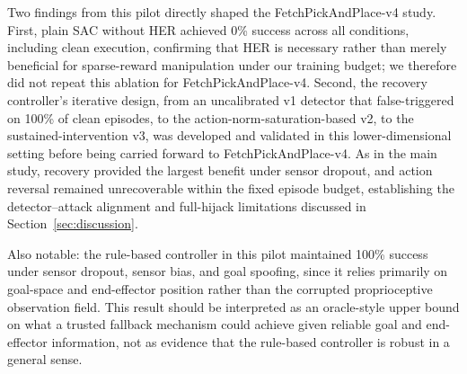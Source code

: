 \documentclass[conference]{IEEEtran}
\begin{document}
Two findings from this pilot directly shaped the FetchPickAndPlace-v4 study. First,
plain SAC without HER achieved 0\% success across all conditions, including clean
execution, confirming that HER is necessary rather than merely beneficial for
sparse-reward manipulation under our training budget; we therefore did not repeat this
ablation for FetchPickAndPlace-v4. Second, the recovery controller's iterative design,
from an uncalibrated v1 detector that false-triggered on 100\% of clean episodes, to
the action-norm-saturation-based v2, to the sustained-intervention v3, was developed
and validated in this lower-dimensional setting before being carried forward to
FetchPickAndPlace-v4. As in the main study, recovery provided the largest benefit under
sensor dropout, and action reversal remained unrecoverable within the fixed episode
budget, establishing the detector--attack alignment and full-hijack limitations
discussed in Section~\ref{sec:discussion}.

Also notable: the rule-based controller in this pilot maintained 100\% success under
sensor dropout, sensor bias, and goal spoofing, since it relies primarily on
goal-space and end-effector position rather than the corrupted proprioceptive
observation field. This result should be interpreted as an oracle-style upper bound on
what a trusted fallback mechanism could achieve given reliable goal and end-effector
information, not as evidence that the rule-based controller is robust in a general
sense.




\end{document}
